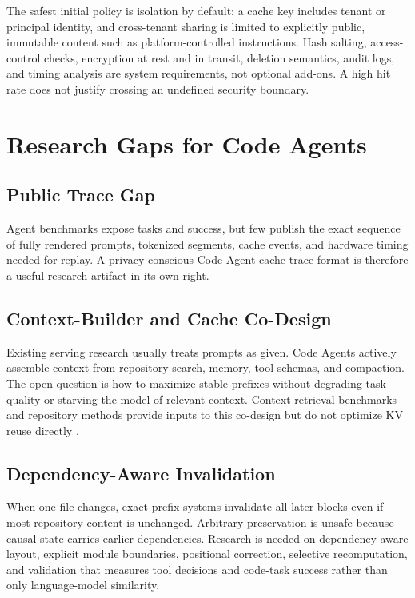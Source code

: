 \documentclass[conference,10pt]{IEEEtran}
\begin{document}
The safest initial policy is isolation by default: a cache key includes tenant or principal identity, and cross-tenant sharing is limited to explicitly public, immutable content such as platform-controlled instructions. Hash salting, access-control checks, encryption at rest and in transit, deletion semantics, audit logs, and timing analysis are system requirements, not optional add-ons. A high hit rate does not justify crossing an undefined security boundary.

\section{Research Gaps for Code Agents}

\subsection{Public Trace Gap}

Agent benchmarks expose tasks and success, but few publish the exact sequence of fully rendered prompts, tokenized segments, cache events, and hardware timing needed for replay. A privacy-conscious Code Agent cache trace format is therefore a useful research artifact in its own right.

\subsection{Context-Builder and Cache Co-Design}

Existing serving research usually treats prompts as given. Code Agents actively assemble context from repository search, memory, tool schemas, and compaction. The open question is how to maximize stable prefixes without degrading task quality or starving the model of relevant context. Context retrieval benchmarks and repository methods provide inputs to this co-design but do not optimize KV reuse directly \cite{li2026contextbench,liu2023repobench,zhang2023repocoder}.

\subsection{Dependency-Aware Invalidation}

When one file changes, exact-prefix systems invalidate all later blocks even if most repository content is unchanged. Arbitrary preservation is unsafe because causal state carries earlier dependencies. Research is needed on dependency-aware layout, explicit module boundaries, positional correction, selective recomputation, and validation that measures tool decisions and code-task success rather than only language-model similarity.
\end{document}
